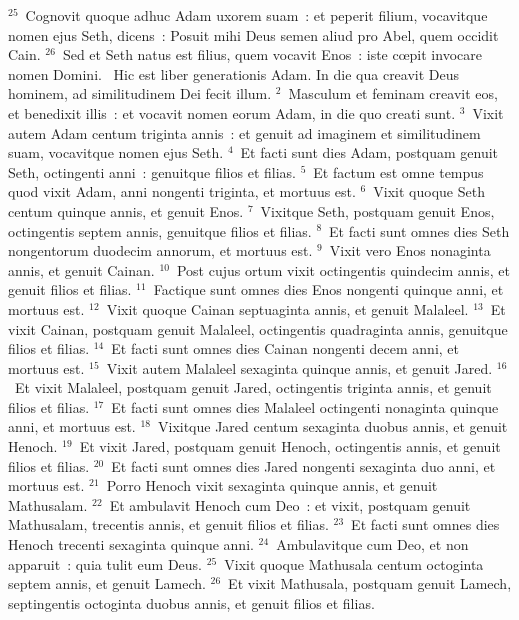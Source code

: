 ${}^{25}$~Cognovit quoque adhuc Adam uxorem suam~: et peperit filium, vocavitque nomen ejus Seth, dicens~: Posuit mihi Deus semen aliud pro Abel, quem occidit Cain.
${}^{26}$~Sed et Seth natus est filius, quem vocavit Enos~: iste cœpit invocare nomen Domini.
~Hic est liber generationis Adam. In die qua creavit Deus hominem, ad similitudinem Dei fecit illum.
${}^{2}$~Masculum et feminam creavit eos, et benedixit illis~: et vocavit nomen eorum Adam, in die quo creati sunt.
${}^{3}$~Vixit autem Adam centum triginta annis~: et genuit ad imaginem et similitudinem suam, vocavitque nomen ejus Seth.
${}^{4}$~Et facti sunt dies Adam, postquam genuit Seth, octingenti anni~: genuitque filios et filias.
${}^{5}$~Et factum est omne tempus quod vixit Adam, anni nongenti triginta, et mortuus est.
${}^{6}$~Vixit quoque Seth centum quinque annis, et genuit Enos.
${}^{7}$~Vixitque Seth, postquam genuit Enos, octingentis septem annis, genuitque filios et filias.
${}^{8}$~Et facti sunt omnes dies Seth nongentorum duodecim annorum, et mortuus est.
${}^{9}$~Vixit vero Enos nonaginta annis, et genuit Cainan.
${}^{10}$~Post cujus ortum vixit octingentis quindecim annis, et genuit filios et filias.
${}^{11}$~Factique sunt omnes dies Enos nongenti quinque anni, et mortuus est.
${}^{12}$~Vixit quoque Cainan septuaginta annis, et genuit Malaleel.
${}^{13}$~Et vixit Cainan, postquam genuit Malaleel, octingentis quadraginta annis, genuitque filios et filias.
${}^{14}$~Et facti sunt omnes dies Cainan nongenti decem anni, et mortuus est.
${}^{15}$~Vixit autem Malaleel sexaginta quinque annis, et genuit Jared.
${}^{16}$~Et vixit Malaleel, postquam genuit Jared, octingentis triginta annis, et genuit filios et filias.
${}^{17}$~Et facti sunt omnes dies Malaleel octingenti nonaginta quinque anni, et mortuus est.
${}^{18}$~Vixitque Jared centum sexaginta duobus annis, et genuit Henoch.
${}^{19}$~Et vixit Jared, postquam genuit Henoch, octingentis annis, et genuit filios et filias.
${}^{20}$~Et facti sunt omnes dies Jared nongenti sexaginta duo anni, et mortuus est.
${}^{21}$~Porro Henoch vixit sexaginta quinque annis, et genuit Mathusalam.
${}^{22}$~Et ambulavit Henoch cum Deo~: et vixit, postquam genuit Mathusalam, trecentis annis, et genuit filios et filias.
${}^{23}$~Et facti sunt omnes dies Henoch trecenti sexaginta quinque anni.
${}^{24}$~Ambulavitque cum Deo, et non apparuit~: quia tulit eum Deus.
${}^{25}$~Vixit quoque Mathusala centum octoginta septem annis, et genuit Lamech.
${}^{26}$~Et vixit Mathusala, postquam genuit Lamech, septingentis octoginta duobus annis, et genuit filios et filias.
